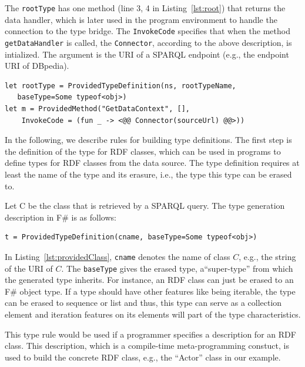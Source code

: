 \documentclass{llncs} %
\newcommand{\fs}{\textsf{F\#}\xspace}
\begin{document}
The \texttt{rootType} has one method (line 3, 4 in Listing~\ref{lst:root}) that
returns the data handler, which is later used in the program environment to handle the
connection to the type bridge. The \texttt{InvokeCode} specifies that when the method \texttt{getDataHandler}
is called, the \texttt{Connector}, according to the above description, is intialized. The argument is the URI
of a SPARQL endpoint (e.g., the endpoint URI of DBpedia). 

\begin{lstlisting}[style=code, caption={\textbf{Basic Rule:} For the generation of a root type with data handler}, label={lst:root}]
let rootType = ProvidedTypeDefinition(ns, rootTypeName,
   baseType=Some typeof<obj>)
let m = ProvidedMethod("GetDataContext", [], 
    InvokeCode = (fun _ -> <@@ Connector(sourceUrl) @@>))       
\end{lstlisting}

In the following, we describe  rules for building type definitions.
The first step is the definition of the type for RDF classes, which can be used in programs
to define types for RDF classes from the data source.
The type definition requires at least the name of the type and its erasure, i.e., the type this type can be erased to.

Let C be the class that is retrieved by a SPARQL query. The type generation description in \fs
is as follows:

\begin{lstlisting}[style=code, caption={\textbf{Type Rule:} Type Generation Description for RDF Class C}, label={lst:providedClass}]
t = ProvidedTypeDefinition(cname, baseType=Some typeof<obj>)
\end{lstlisting}

In Listing~\ref{lst:providedClass}, \texttt{cname} denotes the name of class $C$, e.g., the string of the URI of $C$.
The \texttt{baseType} gives the erased type, a``super-type'' from which the generated type  inherits.
For instance, an RDF class can just be erased to an \fs object type. If a type should have other features
like being iterable, the type can be erased to sequence or list and thus, this type can serve as a collection
element and iteration features on its elements will part of the type characteristics.

This type rule would be used if a programmer specifies a description for an RDF class.
This description, which is a compile-time meta-programming constuct, is
used to build the concrete RDF class, e.g., the ``Actor'' class in our example.
\end{document}
